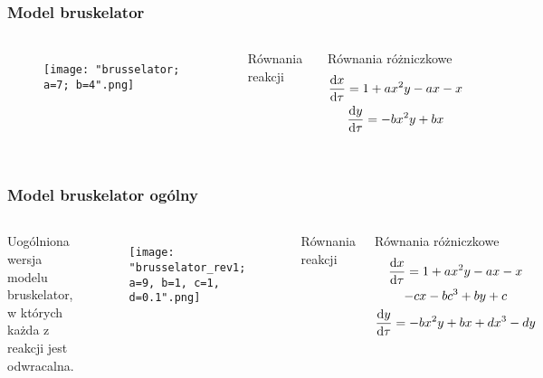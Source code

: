 \documentclass{beamer}
\begin{document}
\begin{frame}
\frametitle{Model bruskelator}
\begin{columns}

\begin{figure}
\texttt{[image: "brusselator; a=7; b=4".png]}
\end{figure}
\begin{block}{Równania reakcji}
\begin{center}
	 \\
	 \\
	 \\
\end{center}
\end{block}
\begin{block}{Równania różniczkowe}
\begin{gather*}
	\dv{x}{\tau} = 1+ax^{2}y-ax-x \\
	\dv{y}{\tau} = -bx^{2}y+bx
\end{gather*}
\end{block}
\end{columns}
\end{frame}

\begin{frame}
\frametitle{Model bruskelator ogólny}
\begin{columns}
Uogólniona wersja modelu bruskelator, w których każda z reakcji jest odwracalna. 
\begin{figure}
\texttt{[image: "brusselator\_rev1; a=9, b=1, c=1, d=0.1".png]}
\end{figure}
\begin{block}{Równania reakcji}
\begin{center}
	 \\
	 \\
	 \\
\end{center}
\end{block}
\begin{block}{Równania różniczkowe}
\begin{gather*}
	\dv{x}{\tau} = 1 + ax^{2}y - ax - x \\
	- cx - bc^{3} + by + c \\
	\dv{y}{\tau} = -bx^{2}y + bx + dx^{3} - dy
\end{gather*}
\end{block}
\end{columns}
\end{frame}
\end{document}
